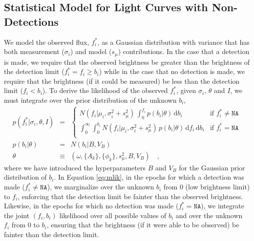 \documentclass[12pt,preprint]{aastex}
\newcommand{\dd}{\mathrm{d}}
\newcommand{\fobs}{f_i^*}
\begin{document}
\subsection{Statistical Model for Light Curves with Non-Detections}

We model the observed flux, $\fobs$, as a Gaussian distribution with variance that has both measurement ($\sigma_i$) and model ($s_{\mu}$) contributions.  In the case that a detection is made, we require that the observed brightness be greater than the brightness of the detection limit ($\fobs = f_i \ge b_i$) while in the case that no detection is made, we require that the brightness (if it could be measured) be less than the detection limit ($f_i < b_i$).  To derive the likelihood of the observed $\fobs$, given $\sigma_i$, $\theta$ and $I$, we must integrate over the prior distribution of the unknown $b_i$,
\begin{eqnarray}\displaystyle
p(\fobs |\sigma_i,\theta,I) &=& \left\{\begin{array}{ll}
  N(f_i | \mu_i,  \sigma_i^2 + s_{\mu}^2)\,  \int_0^{f_i} p(b_i | \theta)\, \dd b_i & \mbox{if $\fobs \ne \texttt{NA}$} \\
  \int_{0}^{\infty} \int_{0}^{b_i} N(f_i | \mu_i, \sigma_i^2 + s_{\mu}^2)\, p(b_i | \theta)\, \dd f_i\, \dd b_i & \mbox{if $\fobs = \texttt{NA}$} \\
\end{array}\right.\label{eq:mlik}
\\
p(b_i|\theta) &=& N(b_i|B,V_B)
\label{eq:bprior}
\\
\theta &\equiv& (\omega, \{A_k\}, \{\phi_k\}, s_\mu^2, B, V_B) \quad ,
\end{eqnarray}
where we have introduced the hyperparameters $B$ and $V_B$ for the Gaussian prior distribution of $b_i$.  In Equation \ref{eq:mlik}, in the epochs for which a detection was made ($\fobs \ne \texttt{NA}$), we marginalize over the unknown $b_i$ from $0$ (low brightness limit) to $f_i$, enforcing that the detection limit be fainter than the observed brightness.  Likewise, in the epochs for which no detection was made ($\fobs = \texttt{NA}$), we integrate the joint $(f_i, b_i)$ likelihood over all possible values of $b_i$ and over the unknown $f_i$ from $0$ to $b_i$, ensuring that the brightness (if it were able to be observed) be fainter than the detection limit.
\end{document}
